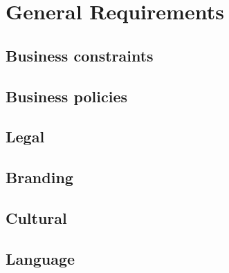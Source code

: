 \section{General Requirements}

\subsection{Business constraints}

\subsection{Business policies}

\subsection{Legal}

\subsection{Branding}

\subsection{Cultural}

\subsection{Language}

